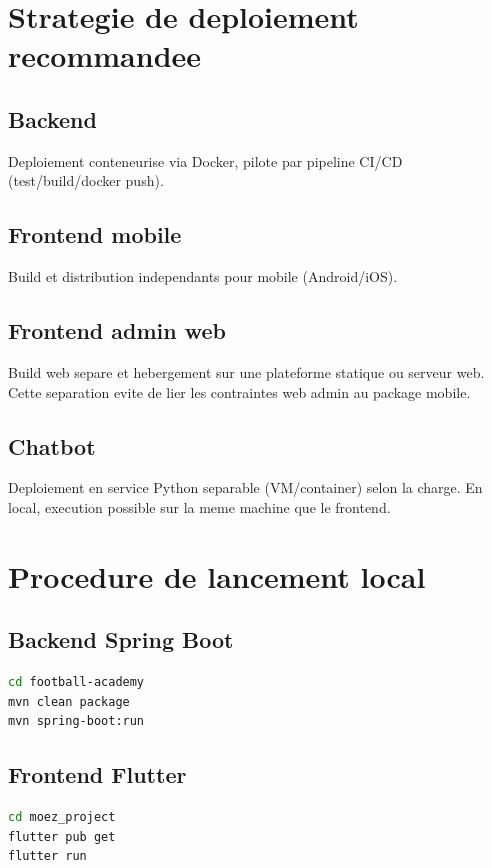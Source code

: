 \section{Strategie de deploiement recommandee}

\subsection*{Backend}
Deploiement conteneurise via Docker, pilote par pipeline CI/CD (test/build/docker push).

\subsection*{Frontend mobile}
Build et distribution independants pour mobile (Android/iOS).

\subsection*{Frontend admin web}
Build web separe et hebergement sur une plateforme statique ou serveur web. Cette separation evite de lier les contraintes web admin au package mobile.

\subsection*{Chatbot}
Deploiement en service Python separable (VM/container) selon la charge. En local, execution possible sur la meme machine que le frontend.

\section{Procedure de lancement local}

\subsection*{Backend Spring Boot}
\begin{lstlisting}[style=codeblock,language=bash]
cd football-academy
mvn clean package
mvn spring-boot:run
\end{lstlisting}

\subsection*{Frontend Flutter}
\begin{lstlisting}[style=codeblock,language=bash]
cd moez_project
flutter pub get
flutter run
\end{lstlisting}

